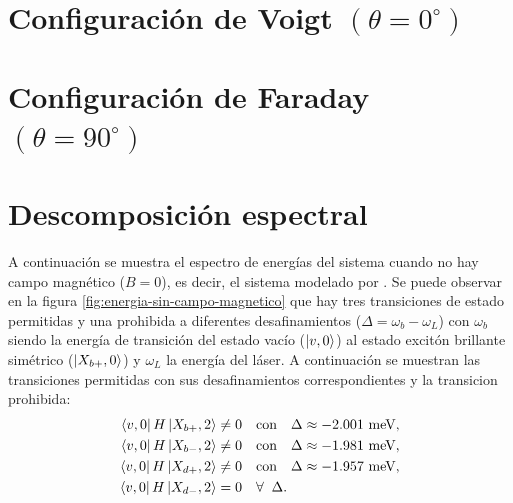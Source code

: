 \documentclass[main.tex]{subfiles}
\begin{document}
\section{Configuraci\'on de Voigt $(\theta = 0^\circ)$}

\section{Configuraci\'on de Faraday $(\theta = 90^\circ)$}

\section{Descomposici\'on espectral}

A continuaci\'on se muestra el espectro de energ\'ias del sistema cuando no hay campo magn\'etico ($B=0$), es decir, el sistema modelado por \parencite{Vargas2022}. Se puede observar en la figura \ref{fig:energia-sin-campo-magnetico} que hay tres transiciones de estado permitidas y una prohibida a diferentes desafinamientos ($\Delta = \omega_b-\omega_L$) con $\omega_b$ siendo la energ\'ia de transici\'on del estado vac\'io ($\ket{v,0}$) al estado excit\'on brillante sim\'etrico ($\ket{X_{b+},0}$) y $\omega_L$ la energ\'ia del l\'aser. A continuaci\'on se muestran las transiciones permitidas con sus desafinamientos correspondientes y la transicion prohibida:
\begin{align}
	\bra{v,0}H\ket{X_{b+},2} &\neq 0 \quad \text{con} \quad \Delta \approx -2.001 \text{ meV},\\
	\bra{v,0}H\ket{X_{b-},2} &\neq 0 \quad \text{con} \quad \Delta \approx -1.981 \text{ meV},\\
	\bra{v,0}H\ket{X_{d+},2} &\neq 0 \quad \text{con} \quad \Delta \approx -1.957 \text{ meV},\\
	\bra{v,0}H\ket{X_{d-},2} &= 0 \quad \forall \;\; \Delta.
\end{align}
\end{document}
